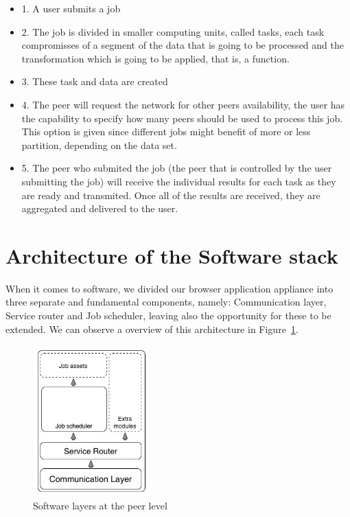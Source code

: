 \begin{itemize}
    \item 1. A user submits a job
    \item 2. The job is divided in smaller computing units, called tasks, each task compromisses of a segment of the data that is going to be processed and the transformation which is going to be applied, that is, a function.
    \item 3. These task and data are created
    \item 4. The peer will request the network for other peers availability, the user has the capability to specify how many peers should be used to process this job. This option is given since different jobs might benefit of more or less partition, depending on the data set.
    \item 5. The peer who submited the job (the peer that is controlled by the user submitting the job) will receive the individual results for each task as they are ready and transmited. Once all of the results are received, they are aggregated and delivered to the user.
\end{itemize}

\section{Architecture of the Software stack}

When it comes to software, we divided our browser application appliance into three separate and fundamental components, namely: Communication layer, Service router and Job scheduler, leaving also the opportunity for these to be extended. We can observe a overview of this architecture in Figure~\ref{fig:s-a-n-l}.

\begin{figure}[h!]
  \centering
  \includegraphics[width=0.4\textwidth]{figs/software-architecture-node-level}
  \caption{Software layers at the peer level}
  \label{fig:s-a-n-l}
\end{figure}


